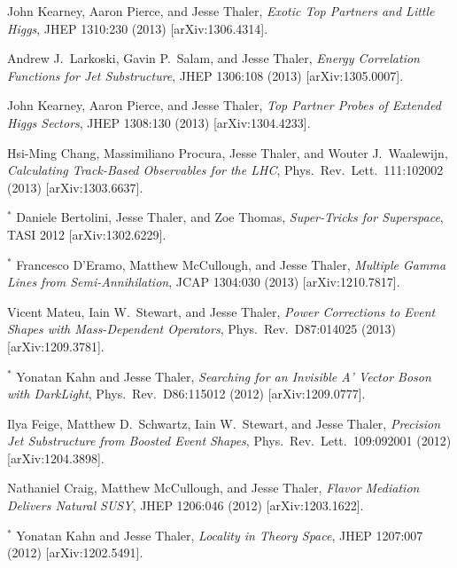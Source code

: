 \begin{list}{[]\addtocounter{jessecount}{-1}}{\leftmargin=3em \itemsep=4pt}
\item
 John Kearney, Aaron Pierce, and Jesse Thaler,
\emph{Exotic Top Partners and Little Higgs},
JHEP 1310:230 (2013)
[arXiv:1306.4314].

\item
 Andrew J.\ Larkoski, Gavin P.\ Salam, and Jesse Thaler,
\emph{Energy Correlation Functions for Jet Substructure},
JHEP 1306:108 (2013)
[arXiv:1305.0007].

\item
 John Kearney, Aaron Pierce, and Jesse Thaler,
\emph{Top Partner Probes of Extended Higgs Sectors},
JHEP 1308:130 (2013)
[arXiv:1304.4233].

\item
 Hsi-Ming Chang, Massimiliano Procura, Jesse Thaler, and Wouter J.\ Waalewijn,
\emph{Calculating Track-Based Observables for the LHC},
Phys.\ Rev.\ Lett.\ 111:102002 (2013)
[arXiv:1303.6637].

\item
${}^\ast$ Daniele Bertolini, Jesse Thaler, and Zoe Thomas,
\emph{Super-Tricks for Superspace},
TASI 2012
[arXiv:1302.6229].

\item
${}^\ast$ Francesco D'Eramo, Matthew McCullough, and Jesse Thaler,
\emph{Multiple Gamma Lines from Semi-Annihilation},
JCAP 1304:030 (2013)
[arXiv:1210.7817].

\item
 Vicent Mateu, Iain W.\ Stewart, and Jesse Thaler,
\emph{Power Corrections to Event Shapes with Mass-Dependent Operators},
Phys.\ Rev.\ D87:014025 (2013)
[arXiv:1209.3781].

\item
${}^\ast$ Yonatan Kahn and Jesse Thaler,
\emph{Searching for an Invisible A' Vector Boson with DarkLight},
Phys.\ Rev.\ D86:115012 (2012)
[arXiv:1209.0777].

\item
 Ilya Feige, Matthew D.\ Schwartz, Iain W.\ Stewart, and Jesse Thaler,
\emph{Precision Jet Substructure from Boosted Event Shapes},
Phys.\ Rev.\ Lett.\ 109:092001 (2012)
[arXiv:1204.3898].

\item
 Nathaniel Craig, Matthew McCullough, and Jesse Thaler,
\emph{Flavor Mediation Delivers Natural SUSY},
JHEP 1206:046 (2012)
[arXiv:1203.1622].

\item
${}^\ast$ Yonatan Kahn and Jesse Thaler,
\emph{Locality in Theory Space},
JHEP 1207:007 (2012)
[arXiv:1202.5491].


\end{list}
